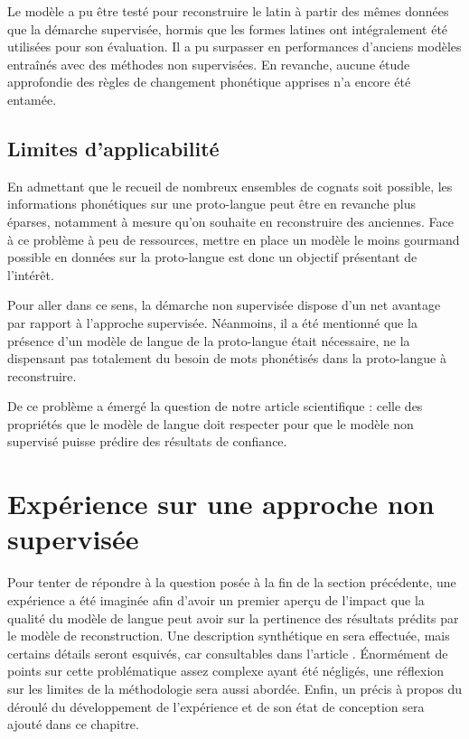 \documentclass[12pt, french, twoside]{report}
\begin{document}
\vspace{12pt}
Le modèle a pu être testé pour reconstruire le latin à partir des mêmes données que la démarche supervisée, hormis que les formes latines ont intégralement été utilisées pour son évaluation. Il a pu surpasser en performances d'anciens modèles entraînés avec des méthodes non supervisées. En revanche, aucune étude approfondie des règles de changement phonétique apprises n'a encore été entamée. \citep[Section 7]{he2022neural}


\subsection{Limites d'applicabilité}
En admettant que le recueil de nombreux ensembles de cognats soit possible, les informations phonétiques sur une proto-langue peut être en revanche plus éparses, notamment à mesure qu'on souhaite en reconstruire des anciennes. Face à ce problème à peu de ressources, mettre en place un modèle le moins gourmand possible en données sur la proto-langue est donc un objectif présentant de l'intérêt.

Pour aller dans ce sens, la démarche non supervisée dispose d'un net avantage par rapport à l'approche supervisée. Néanmoins, il a été mentionné que la présence d'un modèle de langue de la proto-langue était nécessaire, ne la dispensant pas totalement du besoin de mots phonétisés dans la proto-langue à reconstruire.

De ce problème a émergé la question de notre article scientifique : celle des propriétés que le modèle de langue doit respecter pour que le modèle non supervisé puisse prédire des résultats de confiance.

\section{Expérience sur une approche non supervisée}

Pour tenter de répondre à la question posée à la fin de la section précédente, une expérience a été imaginée afin d'avoir un premier aperçu de l'impact que la qualité du modèle de langue peut avoir sur la pertinence des résultats prédits par le modèle de reconstruction. Une description synthétique en sera effectuée, mais certains détails seront esquivés, car consultables dans l'article \citep{notreArticle}. Énormément de points sur cette problématique assez complexe ayant été négligés, une réflexion sur les limites de la méthodologie sera aussi abordée. Enfin, un précis à propos du déroulé du développement de l'expérience et de son état de conception sera ajouté dans ce chapitre.
\end{document}
